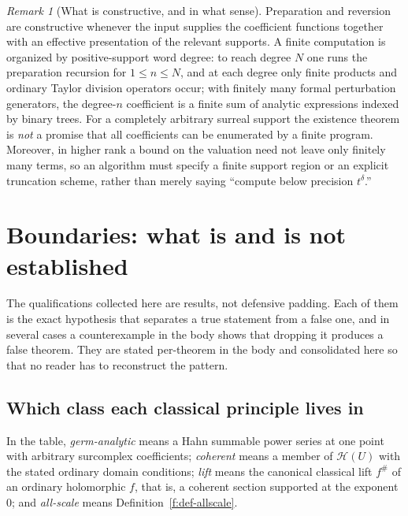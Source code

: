 \documentclass[11pt,a4paper]{article}
\numberwithin{equation}{section}
\theoremstyle{definition}
\theoremstyle{remark}
\newtheorem{remark}[theorem]{Remark}
\theoremstyle{plain}
\newcommand{\ev}[1]{#1^{\#}}
\newcommand{\Hc}{\mathcal H}
\begin{document}
\begin{remark}[What is constructive, and in what
sense]\label{f:rem-constructive}
Preparation and reversion are constructive whenever the input supplies
the coefficient functions together with an effective presentation of the
relevant supports.  A finite computation is organized by
positive-support word degree: to reach degree $N$ one runs the
preparation recursion for $1\le n\le N$, and at each degree only finite
products and ordinary Taylor division operators occur; with finitely
many formal perturbation generators, the degree-$n$ coefficient is a
finite sum of analytic expressions indexed by binary trees.  For a
completely arbitrary surreal support the existence theorem is \emph{not}
a promise that all coefficients can be enumerated by a finite program.
Moreover, in higher rank a bound on the valuation need not leave only
finitely many terms, so an algorithm must specify a finite support
region or an explicit truncation scheme, rather than merely saying
``compute below precision $t^{\delta}$.''
\end{remark}


\section{Boundaries: what is and is not established}
\label{f:sec-boundaries}

The qualifications collected here are results, not defensive padding.
Each of them is the exact hypothesis that separates a true statement
from a false one, and in several cases a counterexample in the body
shows that dropping it produces a false theorem.  They are stated
per-theorem in the body and consolidated here so that no reader has to
reconstruct the pattern.

\subsection{Which class each classical principle lives in}
\label{f:sub-hypchart}

In the table, \emph{germ-analytic} means a Hahn summable power series at
one point with arbitrary surcomplex coefficients; \emph{coherent} means
a member of $\Hc(U)$ with the stated ordinary domain conditions;
\emph{lift} means the canonical classical lift $\ev f$ of an ordinary
holomorphic $f$, that is, a coherent section supported at the exponent
$0$; and \emph{all-scale} means Definition~\ref{f:def-allscale}.
\end{document}

